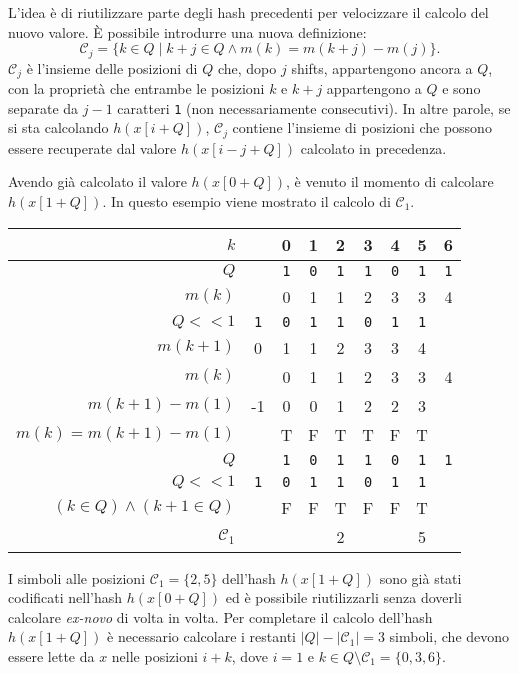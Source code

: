 L'idea è di riutilizzare parte degli hash precedenti per velocizzare il calcolo del nuovo valore. È possibile introdurre una nuova definizione: \[ \mathcal{C}_j = \{ k \in Q \; | \; k + j \in Q \wedge m(k) = m(k + j) - m(j) \}. \] $\mathcal{C}_j$ è l'insieme delle posizioni di $Q$ che, dopo $j$ shifts, appartengono ancora a $Q$, con la proprietà che entrambe le posizioni $k$ e $k + j$ appartengono a $Q$ e sono separate da $j - 1$ caratteri \texttt{1} (non necessariamente consecutivi). In altre parole, se si sta calcolando $h(x[i + Q])$, $\mathcal{C}_j$ contiene l'insieme di posizioni che possono essere recuperate dal valore $h(x[i - j + Q])$ calcolato in precedenza.

\begin{example}
	Avendo già calcolato il valore $h(x[0 + Q])$, è venuto il momento di calcolare $h(x[1 + Q])$. In questo esempio viene mostrato il calcolo di $\mathcal{C}_1$.
	
	{
		\centering
		\begin{tabular}{r | cccccccc}
			$k$ & & 0 & 1 & 2 & 3 & 4 & 5 & 6 \\
			\midrule
			$Q$ & & \texttt{1} & \texttt{0} & \texttt{1} & \texttt{1} & \texttt{0} & \texttt{1} & \texttt{1} \\
			$m(k)$ & & 0 & 1 & 1 & 2 & 3 & 3 & 4 \\
			\midrule
			$Q <\!< 1$ & \texttt{1} & \texttt{0} & \texttt{1} & \texttt{1} & \texttt{0} & \texttt{1} & \texttt{1} & \\
			$m(k + 1)$ & 0 & 1 & 1 & 2 & 3 & 3 & 4 & \\
			\midrule
			$m(k)$ & & 0 & 1 & 1 & 2 & 3 & 3 & 4 \\
			$m(k + 1) - m(1)$ & -1 & 0 & 0 & 1 & 2 & 2 & 3 & \\
			$m(k) = m(k + 1) - m(1)$ & & T & F & T & T & F & T & \\
			\midrule
			$Q$ & & \texttt{1} & \texttt{0} & \texttt{1} & \texttt{1} & \texttt{0} & \texttt{1} & \texttt{1} \\
			$Q <\!< 1$ & \texttt{1} & \texttt{0} & \texttt{1} & \texttt{1} & \texttt{0} & \texttt{1} & \texttt{1} & \\
			$(k \in Q) \wedge (k + 1 \in Q)$ & & F & F & T & F & F & T & \\
			\midrule
			$\mathcal{C}_1$ & & & & 2 & & & 5 & \\
		\end{tabular}
	
	}
	
	I simboli alle posizioni $\mathcal{C}_1 = \{ 2, 5 \}$ dell'hash $h(x[1 + Q])$ sono già stati codificati nell'hash $h(x[0 + Q])$ ed è possibile riutilizzarli senza doverli calcolare \emph{ex-novo} di volta in volta. Per completare il calcolo dell'hash $h(x[1 + Q])$ è necessario calcolare i restanti $|Q| - |\mathcal{C}_1| = 3$ simboli, che devono essere lette da $x$ nelle posizioni $i + k$, dove $i = 1$ e $k \in Q \setminus \mathcal{C}_1 = \{ 0, 3, 6 \}$.
	

\end{example}
